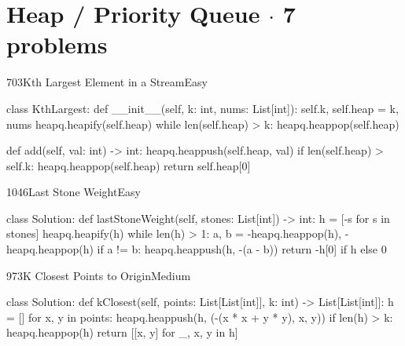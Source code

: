 \section{Heap / Priority Queue {\normalsize\color{muted}$\cdot$ 7 problems}}

\begin{problem}{703}{Kth Largest Element in a Stream}{Easy}
\begin{code}
class KthLargest:
    def __init__(self, k: int, nums: List[int]):
        self.k, self.heap = k, nums
        heapq.heapify(self.heap)
        while len(self.heap) > k:
            heapq.heappop(self.heap)

    def add(self, val: int) -> int:
        heapq.heappush(self.heap, val)
        if len(self.heap) > self.k:
            heapq.heappop(self.heap)
        return self.heap[0]
\end{code}
\end{problem}

\begin{problem}{1046}{Last Stone Weight}{Easy}
\begin{code}
class Solution:
    def lastStoneWeight(self, stones: List[int]) -> int:
        h = [-s for s in stones]
        heapq.heapify(h)
        while len(h) > 1:
            a, b = -heapq.heappop(h), -heapq.heappop(h)
            if a != b:
                heapq.heappush(h, -(a - b))
        return -h[0] if h else 0
\end{code}
\end{problem}

\begin{problem}{973}{K Closest Points to Origin}{Medium}
\begin{code}
class Solution:
    def kClosest(self, points: List[List[int]], k: int) -> List[List[int]]:
        h = []
        for x, y in points:
            heapq.heappush(h, (-(x * x + y * y), x, y))
            if len(h) > k:
                heapq.heappop(h)
        return [[x, y] for _, x, y in h]
\end{code}
\end{problem}

